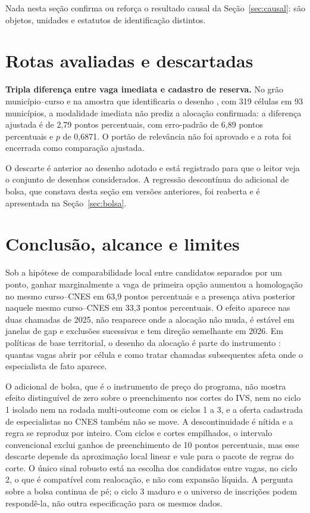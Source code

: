 \documentclass[11pt,a4paper]{article}
\begin{document}
Nada nesta seção confirma ou reforça o resultado causal da
Seção~\ref{sec:causal}: são objetos, unidades e estatutos de identificação
distintos.

\section{Rotas avaliadas e descartadas}
\label{sec:rotas}

\textbf{Tripla diferença entre vaga imediata e cadastro de reserva.} No grão
município--curso e na amostra que identificaria o desenho
\citep{olden2022}, com 319 células em 93 municípios, a modalidade imediata não
prediz a alocação confirmada: a diferença ajustada é de 2,79 pontos
percentuais, com erro-padrão de 6,89 pontos percentuais e $p$ de 0,6871. O
portão de relevância não foi aprovado e a rota foi encerrada como comparação
ajustada.

O descarte é anterior ao desenho adotado e está registrado para que o leitor
veja o conjunto de desenhos considerados. A regressão descontínua do adicional
de bolsa, que constava desta seção em versões anteriores, foi reaberta e é
apresentada na Seção~\ref{sec:bolsa}.

\section{Conclusão, alcance e limites}
\label{sec:conclusao}

Sob a hipótese de comparabilidade local entre candidatos separados por um
ponto, ganhar marginalmente a vaga de primeira opção aumentou a homologação no
mesmo curso--CNES em 63,9 pontos percentuais e a presença ativa posterior
naquele mesmo curso--CNES em 33,3 pontos percentuais. O efeito aparece nas
duas chamadas de 2025, não reaparece onde a alocação não muda, é estável em
janelas de gap e exclusões sucessivas e tem direção semelhante em 2026. Em
políticas de base territorial, o desenho da alocação é parte do instrumento
\citep{kline2014}: quantas vagas abrir por célula e como tratar chamadas
subsequentes afeta onde o especialista de fato aparece.

O adicional de bolsa, que é o instrumento de preço do programa, não mostra
efeito distinguível de zero sobre o preenchimento nos cortes do IVS, nem no
ciclo 1 isolado nem na rodada multi-outcome com os ciclos 1 a 3, e a oferta
cadastrada de especialistas no CNES também não se move. A descontinuidade é
nítida e a regra se reproduz por inteiro. Com ciclos e cortes empilhados, o
intervalo convencional exclui ganhos de preenchimento de 10 pontos
percentuais, mas esse descarte depende da aproximação local linear e vale para
o pacote de regras do corte. O único sinal robusto está na escolha dos
candidatos entre vagas, no ciclo 2, o que é compatível com realocação, e não
com expansão líquida. A pergunta sobre a bolsa continua de pé; o ciclo 3
maduro e o universo de inscrições podem respondê-la, não outra especificação
para os mesmos dados.
\end{document}
